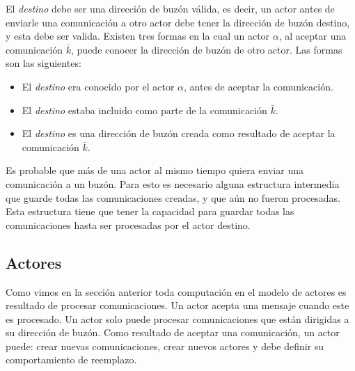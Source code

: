 El \textit{destino} debe ser una dirección de buzón válida, es decir, un actor antes de enviarle una comunicación a otro actor debe tener la dirección de buzón destino, y esta debe ser valida. Existen tres formas en la cual un actor $\alpha$, al aceptar una comunicación $\bar{k}$, puede conocer la dirección de buzón de otro actor. Las formas son las siguientes:

\begin{itemize}
 \item El \textit{destino} era conocido por el actor $\alpha$, antes de aceptar la comunicación.
 \item El \textit{destino} estaba incluido como parte de la comunicación $\bar{k}$.
 \item El \textit{destino} es una dirección de buzón creada como resultado de aceptar la comunicación $\bar{k}$.
\end{itemize}

Es probable que más de una actor al mismo tiempo quiera enviar una comunicación a un buzón. Para esto es necesario alguna estructura intermedia que guarde todas las comunicaciones creadas, y que aún no fueron procesadas. Esta estructura tiene que tener la capacidad para guardar todas las comunicaciones hasta ser procesadas por el actor destino. 



\subsection{Actores}

Como vimos en la sección anterior toda computación en el modelo de actores es resultado de procesar comunicaciones. Un actor acepta una mensaje cuando este es procesado. Un actor solo puede procesar comunicaciones que están dirigidas a su dirección de buzón. Como resultado de aceptar una comunicación, un actor puede: crear nuevas comunicaciones, crear nuevos actores y debe definir su comportamiento de reemplazo.


